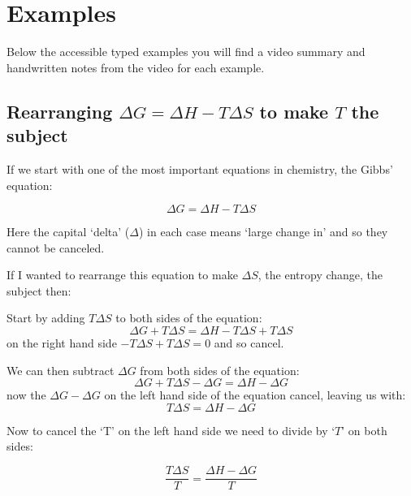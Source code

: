 \documentclass[
]{book}
\begin{document}
\hypertarget{examples}{%
\section{Examples}\label{examples}}

Below the accessible typed examples you will find a video summary and handwritten notes from the video for each example.

\hypertarget{rearranging-delta-g-delta-h---t-delta-s-to-make-t-the-subject}{%
\subsection{\texorpdfstring{Rearranging \(\Delta G = \Delta H - T \Delta S\) to make \(T\) the subject}{Rearranging \textbackslash Delta G = \textbackslash Delta H - T \textbackslash Delta S to make T the subject}}\label{rearranging-delta-g-delta-h---t-delta-s-to-make-t-the-subject}}

If we start with one of the most important equations in chemistry, the Gibbs' equation:

\begin{equation*}
\Delta G = \Delta H - T \Delta S
\end{equation*}

Here the capital `delta' (\(\Delta\)) in each case means `large change in' and so they cannot be canceled.

If I wanted to rearrange this equation to make \(\Delta S\), the entropy change, the subject then:

Start by adding \(T\Delta S\) to both sides of the equation:
\begin{equation*}
\Delta G + T \Delta S= \Delta H - T \Delta S + T \Delta S
\end{equation*}
on the right hand side \(- T \Delta S + T \Delta S=0\) and so cancel.

We can then subtract \(\Delta G\) from both sides of the equation:
\begin{equation*}
\Delta G + T \Delta S -\Delta G = \Delta H -\Delta G
\end{equation*}
now the \(\Delta G -\Delta G\) on the left hand side of the equation cancel, leaving us with:
\begin{equation*}
T \Delta S = \Delta H -\Delta G
\end{equation*}

Now to cancel the `T' on the left hand side we need to divide by `\(T\)' on both sides:

\begin{equation*}
\frac{T \Delta S}{T} = \frac{\Delta H -\Delta G}{T}
\end{equation*}
\end{document}
